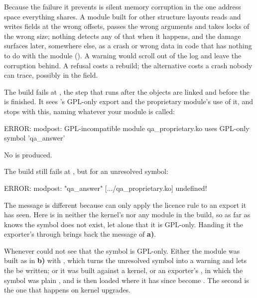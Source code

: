  Because the failure it prevents is silent memory corruption in the one address space
everything shares. A module built for other structure layouts reads and writes fields at the wrong
offsets, passes the wrong arguments and takes locks of the wrong size; nothing detects any of that
when it happens, and the damage surfaces later, somewhere else, as a crash or wrong data in code
that has nothing to do with the module (). A warning would scroll out of the log
and leave the corruption behind. A refusal costs a rebuild; the alternative costs a crash nobody can
trace, possibly in the field.


 The build fails at , the step that runs after the objects are linked and
before the  is finished. It sees 's GPL-only export and the proprietary
module's use of it, and stops with this, naming whatever your module is called:
\begin{console}
ERROR: modpost: GPL-incompatible module qa_proprietary.ko uses GPL-only symbol 'qa_answer'
\end{console}
\noindent No  is produced.

 The build still fails at , but for an unresolved symbol:
\begin{console}
ERROR: modpost: "qa_answer" [.../qa_proprietary.ko] undefined!
\end{console}
\noindent The message is different because  can only apply the licence rule to an
export it has seen. Here  is in neither the kernel's  nor any
module in the build, so as far as  knows the symbol does not exist, let alone that it
is GPL-only. Handing it the exporter's  through 
brings back the message of \textbf{a)}.

 Whenever  could not see that the symbol is GPL-only. Either the module was
built as in \textbf{b)} with , which turns the unresolved symbol into a
warning and lets the  be written; or it was built against a kernel, or an exporter's
, in which the symbol was plain , and is then loaded where
it has since become . The second is the one that happens on kernel upgrades.

